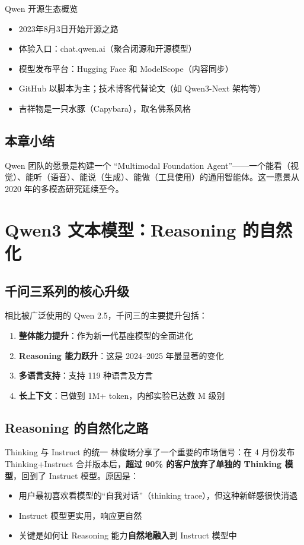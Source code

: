 \documentclass[a4paper]{article}
\begin{document}
\begin{knowledgebox}{Qwen 开源生态概览}
\begin{itemize}
    \item 2023年8月3日开始开源之路
    \item 体验入口：chat.qwen.ai（聚合闭源和开源模型）
    \item 模型发布平台：Hugging Face 和 ModelScope（内容同步）
    \item GitHub 以脚本为主；技术博客代替论文（如 Qwen3-Next 架构等）
    \item 吉祥物是一只水豚（Capybara），取名佛系风格
\end{itemize}
\end{knowledgebox}

\subsection{本章小结}

Qwen 团队的愿景是构建一个 ``Multimodal Foundation Agent''——一个能看（视觉）、能听（语音）、能说（生成）、能做（工具使用）的通用智能体。这一愿景从 2020 年的多模态研究延续至今。

\section{Qwen3 文本模型：Reasoning 的自然化}

\subsection{千问三系列的核心升级}

相比被广泛使用的 Qwen 2.5，千问三的主要提升包括：

\begin{enumerate}
    \item \textbf{整体能力提升}：作为新一代基座模型的全面进化
    \item \textbf{Reasoning 能力跃升}：这是 2024--2025 年最显著的变化
    \item \textbf{多语言支持}：支持 119 种语言及方言
    \item \textbf{长上下文}：已做到 1M+ token，内部实验已达数 M 级别
\end{enumerate}

\subsection{Reasoning 的自然化之路}

\begin{importantbox}{Thinking 与 Instruct 的统一}
林俊旸分享了一个重要的市场信号：在 4 月份发布 Thinking+Instruct 合并版本后，\textbf{超过 90\% 的客户放弃了单独的 Thinking 模型}，回到了 Instruct 模型。原因是：
\begin{itemize}
    \item 用户最初喜欢看模型的``自我对话''（thinking trace），但这种新鲜感很快消退
    \item Instruct 模型更实用，响应更自然
    \item 关键是如何让 Reasoning 能力\textbf{自然地融入}到 Instruct 模型中
\end{itemize}
\end{importantbox}
\end{document}
